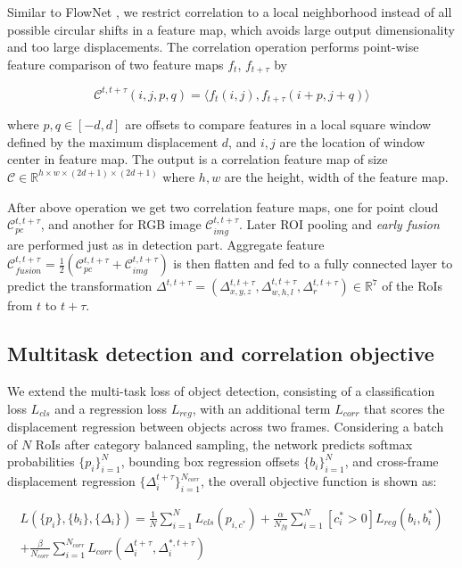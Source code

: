 \documentclass{bmvc2k}
\begin{document}
Similar to FlowNet \cite{dosovitskiy2015flownet}, we restrict correlation to a local neighborhood instead of all possible circular shifts in a feature map, which avoids large output dimensionality and too large displacements. The correlation operation performs point-wise feature comparison of two feature maps $f_t$, $f_{t+\tau}$ by

\begin{equation}
\mathcal{C}^{t, t+\tau}(i, j, p, q) = \Big \langle f_t(i, j), f_{t+\tau} (i+p, j+q) \Big \rangle 
\end{equation}

where $p, q \in [-d, d]$ are offsets to compare features in a local square window defined by the maximum displacement $d$, and $i, j$ are the location of window center in feature map. The output is a correlation feature map of size $\mathcal{C} \in \mathbb{R}^{h \times w \times (2d+1) \times (2d+1)}$ where $h, w$ are the height, width of the feature map.

After above operation we get two correlation feature maps, one for point cloud $\mathcal{C}^{t, t+\tau}_{pc}$, and another for RGB image $\mathcal{C}^{t, t+\tau}_{img}$. Later ROI pooling and \textit{early fusion} are performed just as in detection part. Aggregate feature $\mathcal{C}^{t,t+\tau}_{fusion} = \frac{1}{2}(\mathcal{C}^{t, t+\tau}_{pc} + \mathcal{C}^{t, t+\tau}_{img})$ is then flatten and fed to a fully connected layer to predict the transformation
 $\Delta^{t, t+\tau} = (\Delta^{t,t+\tau}_{x, y, z}, \Delta^{t,t+\tau}_{w, h, l},\Delta^{t,t+\tau}_{r}) \in \mathbb{R}^7$ of the RoIs from $t$ to $t+\tau$. 

\subsection{Multitask detection and correlation objective}
We extend the multi-task loss of object detection, consisting of a classification loss $L_{cls}$ and a regression loss $L_{reg}$, with an additional term $L_{corr}$ that scores the displacement regression between objects across two frames. Considering a batch of $N$ RoIs after category balanced sampling, the network predicts softmax probabilities $\{p_i\}^N_{i=1}$, bounding box regression offsets $\{b_i\}^N_{i=1}$, and cross-frame displacement regression $\{\Delta^{t+\tau}_i\}^{N_{corr}}_{i=1}$, the overall objective function is shown as:

\begin{equation}
\begin{split}
L(\{p_i\}, \{b_i\}, \{\Delta_i\}) = \frac{1}{N} \sum^N_{i=1} L_{cls}(p_{i, c^*}) 
+ \frac{\alpha}{N_{fg}}\sum^N_{i=1} [c^*_i > 0]L_{reg}(b_i, b^*_i) \\
+ \frac{\beta}{N_{corr}} \sum^{N_{corr}}_{i=1}L_{corr}(\Delta^{t+\tau}_i, \Delta^{*, t+\tau}_i)
\end{split}
\end{equation}
\end{document}
